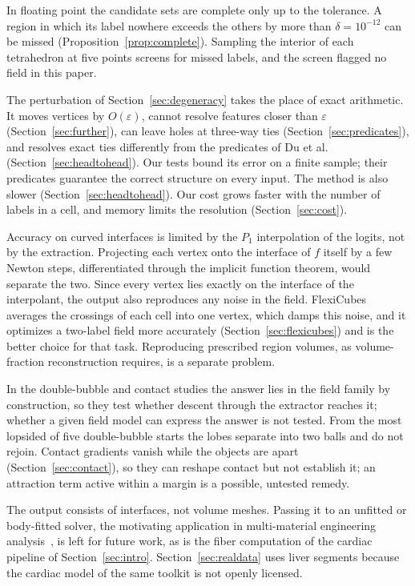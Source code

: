\documentclass{egpubl}
\theoremstyle{definition}
\begin{document}
In floating point the candidate sets are complete only up to the tolerance.
A region in which its label nowhere exceeds the others by more than
$\delta = 10^{-12}$ can be missed (Proposition~\ref{prop:complete}). Sampling
the interior of each tetrahedron at five points screens for missed labels,
and the screen flagged no field in this paper.

The perturbation of Section~\ref{sec:degeneracy} takes the place of
exact arithmetic. It moves vertices by $O(\varepsilon)$, cannot resolve
features closer than $\varepsilon$
(Section~\ref{sec:further}), can leave holes at three-way ties
(Section~\ref{sec:predicates}), and resolves exact ties differently from the
predicates of Du et al.~\cite{du2022} (Section~\ref{sec:headtohead}). Our
tests bound its error on a finite sample; their predicates guarantee
the correct structure on every input. The method is also slower
(Section~\ref{sec:headtohead}). Our cost
grows faster with the number of labels in a cell, and memory limits the
resolution (Section~\ref{sec:cost}).

Accuracy on curved interfaces is limited by the $P_1$ interpolation of the
logits, not by the extraction. Projecting each vertex onto the interface of $f$
itself by a few Newton steps, differentiated through the implicit function theorem, would
separate the two. Since every vertex lies exactly on the interface of the
interpolant, the output also reproduces any noise in the field. FlexiCubes
averages the crossings of each cell into one vertex, which damps this noise,
and it optimizes a two-label field more accurately
(Section~\ref{sec:flexicubes}) and is the better choice for that task.
Reproducing prescribed region volumes, as volume-fraction reconstruction
requires, is a separate problem.

In the double-bubble and contact studies the answer lies in the field family
by construction, so they test whether descent through the extractor reaches
it; whether a given field model can express the answer is not tested. From the most lopsided of five
double-bubble starts the lobes separate into two balls and do not rejoin.
Contact gradients vanish while the objects are apart
(Section~\ref{sec:contact}), so they can reshape contact but not establish it;
an attraction term active within a margin is a possible, untested remedy.

The output consists of interfaces, not volume meshes. Passing it to an
unfitted or body-fitted solver, the motivating application in multi-material
engineering analysis~\cite{fromm2025, nife2024}, is left for future work, as is the fiber
computation of the cardiac pipeline of Section~\ref{sec:intro}.
Section~\ref{sec:realdata} uses liver segments because the cardiac model of
the same toolkit is not openly licensed.
\end{document}
